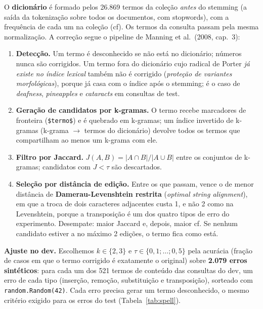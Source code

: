 \documentclass[10pt,a4paper]{article}
\begin{document}
O \textbf{dicionário} é formado pelos 26.869 termos da coleção \emph{antes} do stemming (a saída da tokenização sobre todos os documentos, com stopwords), com a frequência de cada um na coleção (cf). Os termos da consulta passam pela mesma normalização. A correção segue o pipeline de Manning et al.\ (2008, cap.~3):
\begin{enumerate}
\item \textbf{Detecção.} Um termo é desconhecido se não está no dicionário; números nunca são corrigidos. Um termo fora do dicionário cujo radical de Porter \emph{já existe no índice lexical} também não é corrigido (\emph{proteção de variantes morfológicas}), porque já casa com o índice após o stemming; é o caso de \emph{deafness}, \emph{pineapples} e \emph{cataracts} em consultas de test.
\item \textbf{Geração de candidatos por k-gramas.} O termo recebe marcadores de fronteira (\texttt{\$termo\$}) e é quebrado em k-gramas; um índice invertido de k-gramas (k-grama $\to$ termos do dicionário) devolve todos os termos que compartilham ao menos um k-grama com ele.
\item \textbf{Filtro por Jaccard.} $J(A,B) = |A \cap B|/|A \cup B|$ entre os conjuntos de k-gramas; candidatos com $J < \tau$ são descartados.
\item \textbf{Seleção por distância de edição.} Entre os que passam, vence o de menor distância de \textbf{Damerau-Levenshtein restrita} (\emph{optimal string alignment}), em que a troca de dois caracteres adjacentes custa 1, e não 2 como na Levenshtein, porque a transposição é um dos quatro tipos de erro do experimento. Desempate: maior Jaccard e, depois, maior cf. Se nenhum candidato estiver a no máximo 2 edições, o termo fica como está.
\end{enumerate}

\textbf{Ajuste no dev.} Escolhemos $k \in \{2, 3\}$ e $\tau \in \{0{,}1; \dots; 0{,}5\}$ pela acurácia (fração de casos em que o termo corrigido é exatamente o original) sobre \textbf{2.079 erros sintéticos}: para cada um dos 521 termos de conteúdo das consultas do dev, um erro de cada tipo (inserção, remoção, substituição e transposição), sorteado com \texttt{random.Random(42)}. Cada erro precisa gerar um termo desconhecido, o mesmo critério exigido para os erros do test (Tabela~\ref{tab:spell}).
\end{document}
